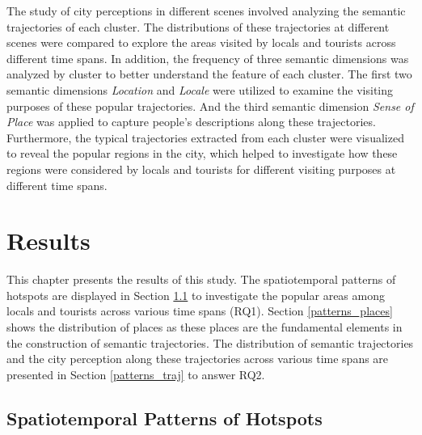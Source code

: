 \documentclass{article}
\theoremstyle{remark}
\begin{document}
The study of city perceptions in different scenes involved analyzing the semantic trajectories of each cluster. The distributions of these trajectories at different scenes were compared to explore the areas visited by locals and tourists across different time spans. In addition, the frequency of three semantic dimensions was analyzed by cluster to better understand the feature of each cluster. The first two semantic dimensions \textit{Location} and \textit{Locale} were utilized to examine the visiting purposes of these popular trajectories. And the third semantic dimension \textit{Sense of Place} was applied to capture people's descriptions along these trajectories. Furthermore, the typical trajectories extracted from each cluster were visualized to reveal the popular regions in the city, which helped to investigate how these regions were considered by locals and tourists for different visiting purposes at different time spans.

\clearpage

\section{Results}
This chapter presents the results of this study. The spatiotemporal patterns of hotspots are displayed in Section \ref{patterns_hotspots} to investigate the popular areas among locals and tourists across various time spans (RQ1). Section \ref{patterns_places} shows the distribution of places as these places are the fundamental elements in the construction of semantic trajectories. The distribution of semantic trajectories and the city perception along these trajectories across various time spans are presented in Section \ref{patterns_traj} to answer RQ2.

\subsection{Spatiotemporal Patterns of Hotspots} \label{patterns_hotspots}
\end{document}

